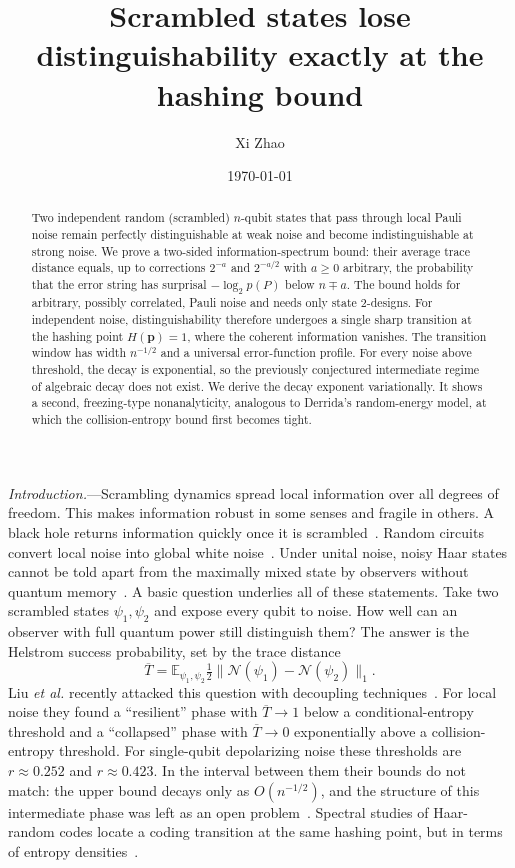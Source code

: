 \documentclass[aps,prl,twocolumn,superscriptaddress,amsmath,amssymb,10pt]{revtex4-2}
\newcommand{\E}{\mathbb{E}}
\newcommand{\Tb}{\overline{T}}
\newcommand{\N}{\mathcal{N}}
\begin{document}
\title{Scrambled states lose distinguishability exactly at the hashing bound}

\author{Xi Zhao}\noaffiliation
\date{\today}

\begin{abstract}
Two independent random (scrambled) $n$-qubit states that pass through local Pauli noise remain perfectly distinguishable at weak noise and become indistinguishable at strong noise. We prove a two-sided information-spectrum bound: their average trace distance equals, up to corrections $2^{-a}$ and $2^{-a/2}$ with $a\ge0$ arbitrary, the probability that the error string has surprisal $-\log_2 p(P)$ below $n\mp a$. The bound holds for arbitrary, possibly correlated, Pauli noise and needs only state 2-designs. For independent noise, distinguishability therefore undergoes a single sharp transition at the hashing point $H(\bm p)=1$, where the coherent information vanishes. The transition window has width $n^{-1/2}$ and a universal error-function profile. For every noise above threshold, the decay is exponential, so the previously conjectured intermediate regime of algebraic decay does not exist. We derive the decay exponent variationally. It shows a second, freezing-type nonanalyticity, analogous to Derrida's random-energy model, at which the collision-entropy bound first becomes tight.
\end{abstract}
\maketitle

\emph{Introduction.}---Scrambling dynamics spread local information over all degrees of freedom. This makes information robust in some senses and fragile in others. A black hole returns information quickly once it is scrambled~\cite{HaydenPreskill}. Random circuits convert local noise into global white noise~\cite{Dalzell}. Under unital noise, noisy Haar states cannot be told apart from the maximally mixed state by observers without quantum memory~\cite{Bansal}. A basic question underlies all of these statements. Take two scrambled states $\psi_1,\psi_2$ and expose every qubit to noise. How well can an observer with full quantum power still distinguish them? The answer is the Helstrom success probability, set by the trace distance
\begin{equation}
\Tb=\E_{\psi_1,\psi_2}\tfrac12\big\|\N(\psi_1)-\N(\psi_2)\big\|_1 .
\label{eq:T}
\end{equation}
Liu \emph{et al.} recently attacked this question with decoupling techniques~\cite{Liu2026}. For local noise they found a ``resilient'' phase with $\Tb\to1$ below a conditional-entropy threshold and a ``collapsed'' phase with $\Tb\to0$ exponentially above a collision-entropy threshold. For single-qubit depolarizing noise these thresholds are $r\approx0.252$ and $r\approx0.423$. In the interval between them their bounds do not match: the upper bound decays only as $O(n^{-1/2})$, and the structure of this intermediate phase was left as an open problem~\cite{Liu2026}. Spectral studies of Haar-random codes locate a coding transition at the same hashing point, but in terms of entropy densities~\cite{Sommers}.
\end{document}
